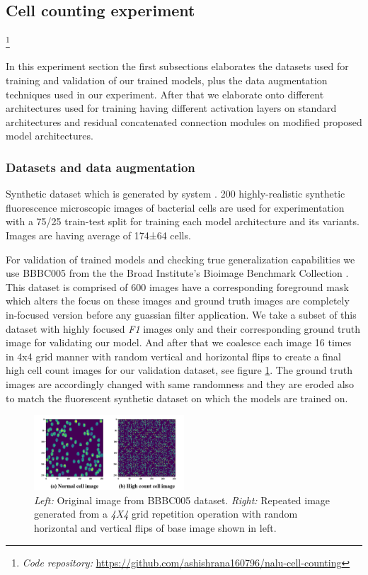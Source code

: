 \documentclass[conference]{IEEEtran}
\begin{document}
\subsection{Cell counting experiment}

\footnote{\textit{Code repository:} \url{https://github.com/ashishrana160796/nalu-cell-counting}}

In this experiment section the first subsections elaborates the datasets used for training and validation of our trained models, plus the data augmentation techniques used in our experiment. After that we elaborate onto different architectures used for training having different activation layers on standard architectures and residual concatenated connection modules on modified proposed model architectures.

\subsubsection{Datasets and data augmentation}

Synthetic dataset which is generated by system \cite{b29}. 200 highly-realistic synthetic fluorescence microscopic images of bacterial cells are used for experimentation with a 75/25 train-test split for training each model architecture and its variants. Images are having average of 174±64 cells.

For validation of trained models and checking true generalization capabilities we use BBBC005 from the the Broad Institute’s Bioimage Benchmark Collection \cite{b10}. This dataset is comprised of 600 images have a corresponding foreground mask which alters the focus on these images and ground truth images are completely in-focused version before any guassian filter application. We take a subset of this dataset with highly focused \textit{F1} images only and their corresponding ground truth image for validating our model. And after that we coalesce each image 16 times in 4x4 grid manner with random vertical and horizontal flips to create a final high cell count images for our validation dataset, see figure \ref{fig6}. The ground truth images are accordingly changed with same randomness and they are eroded also to match the fluorescent synthetic dataset on which the models are trained on.

\begin{figure}[!h]
\centering
\includegraphics[width=0.50\textwidth]{bbbc005cells-fig-compared.png}
\caption{\textit{Left: }Original image from BBBC005 dataset. \textit{Right: }Repeated image generated from a \textit{4X4} grid repetition operation with random horizontal and vertical flips of base image shown in left.}
\label{fig6}
\end{figure}
\end{document}
